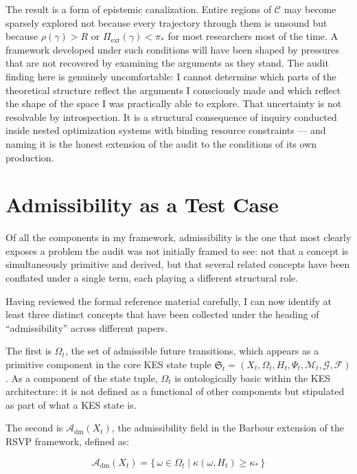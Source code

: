 \documentclass[12pt, a4paper]{article}
\begin{document}
The result is a form of epistemic canalization. Entire regions of $\mathcal{C}$ may become sparsely explored not because every trajectory through them is unsound but because $\rho(\gamma) > R$ or $\Pi_{\mathrm{ext}}(\gamma) < \pi_*$ for most researchers most of the time. A framework developed under such conditions will have been shaped by pressures that are not recovered by examining the arguments as they stand. The audit finding here is genuinely uncomfortable: I cannot determine which parts of the theoretical structure reflect the arguments I consciously made and which reflect the shape of the space I was practically able to explore. That uncertainty is not resolvable by introspection. It is a structural consequence of inquiry conducted inside nested optimization systems with binding resource constraints --- and naming it is the honest extension of the audit to the conditions of its own production.

\section{Admissibility as a Test Case}

Of all the components in my framework, admissibility is the one that most clearly exposes a problem the audit was not initially framed to see: not that a concept is simultaneously primitive and derived, but that several related concepts have been conflated under a single term, each playing a different structural role.

Having reviewed the formal reference material carefully, I can now identify at least three distinct concepts that have been collected under the heading of \enquote{admissibility} across different papers.

The first is $\Omega_t$, the set of admissible future transitions, which appears as a primitive component in the core KES state tuple $\mathfrak{S}_t = (X_t, \Omega_t, H_t, \Psi_t, \mathcal{M}_t, \mathcal{G}, \mathcal{F})$. As a component of the state tuple, $\Omega_t$ is ontologically basic within the KES architecture: it is not defined as a functional of other components but stipulated as part of what a KES state is.

The second is $\mathcal{A}_{\mathrm{dm}}(X_t)$, the admissibility field in the Barbour extension of the RSVP framework, defined as:

\[
\mathcal{A}_{\mathrm{dm}}(X_t) = \bigl\{\,\omega \in \Omega_t \;\big|\; \kappa(\omega, H_t) \geq \kappa_*\,\bigr\}
\]
\end{document}
